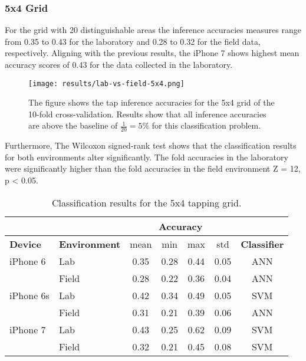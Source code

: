 \subsubsection{5x4 Grid}
For the grid with 20 distinguishable areas the inference accuracies measures range from 0.35 to 0.43 for the laboratory and 0.28 to 0.32 for the field data, respectively. Aligning with the previous results, the iPhone 7 shows highest mean accuracy scores of 0.43 for the data collected in the laboratory. 

\begin{figure}[h!]
  \centering
  \texttt{[image: results/lab-vs-field-5x4.png]}
  \caption{The figure shows the tap inference accuracies for the 5x4 grid of the 10-fold cross-validation. Results show that all inference accuracies are above the baseline of $\frac{1}{20} = 5\%$ for this classification problem.} \label{fig:results-lf-5x4}
\end{figure}



Furthermore, The Wilcoxon signed-rank test shows that the classification results for both environments alter significantly. The fold accuracies in the laboratory were significantly higher than the fold accuracies in the field environment Z = 12, p < 0.05.

\begin{table}[h!]
  \centering
  \begin{tabular}{|l|l|c|c|c|c|c|}
    \cline{3-6}
    \multicolumn{2}{c}{} & \multicolumn{4}{|c|}{\textbf{Accuracy}}  \\
    \hline
    \textbf{Device} & \textbf{Environment} & mean &   min &   max  & std &  \textbf{Classifier} \\
    \hline
    iPhone 6 & Lab &      0.35 &     0.28 &     0.44 &     0.05 &  ANN \\
    & Field &      0.28 &     0.22 &     0.36 &     0.04 &  ANN \\
    \hline
    iPhone 6s & Lab &      0.42 &     0.34 &     0.49 &     0.05 &  SVM \\
    &   Field    &    0.31 &     0.21 &     0.39 &     0.06 &  ANN \\
    \hline
    iPhone 7 & Lab &      0.43 &     0.25 &     0.62 &     0.09 &  SVM \\
    & Field &      0.32 &     0.21 &     0.45 &     0.08 &  SVM \\    
    \hline
  \end{tabular}
  \caption{Classification results for the 5x4 tapping grid.}
\end{table}


